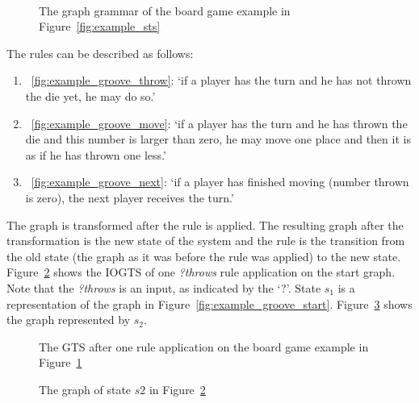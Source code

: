 \begin{figure}[h]
  \begin{center}
    \quad \\
    \hspace{10px}
    \hspace{10px}
  \end{center}
  \caption{The graph grammar of the board game example in Figure~\ref{fig:example_sts}}
  \label{fig:example_groove}
\end{figure}

The rules can be described as follows:
\begin{enumerate}
  \item~\ref{fig:example_groove_throw}: `if a player has the turn and he has not thrown the die yet, he may do so.'
  \item~\ref{fig:example_groove_move}: `if a player has the turn and he has thrown the die and this number is larger than zero, he may move one place and then it is as if he has thrown one less.'
  \item~\ref{fig:example_groove_next}: `if a player has finished moving (number thrown is zero), the next player receives the turn.'
\end{enumerate}

The graph is transformed after the rule is applied. The resulting graph after the transformation is the new state of the system and the rule is the transition from the old state (the graph as it was before the rule was applied) to the new state. Figure~\ref{fig:gts_example} shows the IOGTS of one \textit{?throws} rule application on the start graph. Note that the \textit{?throws} is an input, as indicated by the `?'. State $s_1$ is a representation of the graph in Figure~\ref{fig:example_groove_start}. Figure~\ref{fig:target_graph_state} shows the graph represented by $s_2$.

\begin{figure}[h]
  \begin{center}
    
  \end{center}
  \caption{The GTS after one rule application on the board game example in Figure~\ref{fig:example_groove}}
  \label{fig:gts_example}
\end{figure}

\begin{figure}[h]
  \begin{center}
    
  \end{center}
  \caption{The graph of state $s2$ in Figure~\ref{fig:gts_example}}
  \label{fig:target_graph_state}
\end{figure}